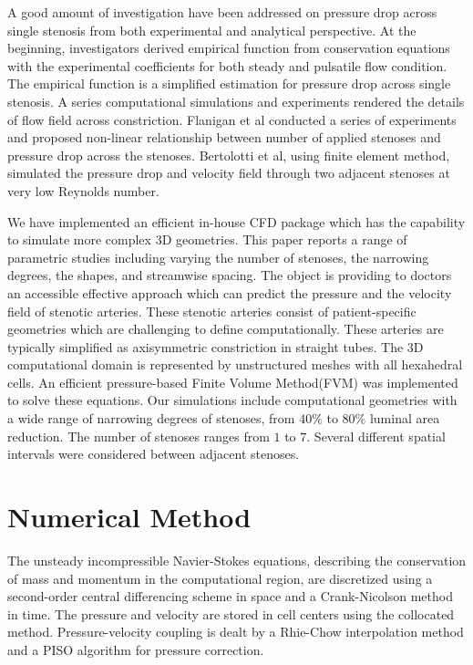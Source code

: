 A good amount of investigation have been addressed on pressure drop across single stenosis from both experimental and analytical perspective\cite{Ojha,Varghese,Young&Tsai,Young&Cholvin,Seeley&Young,Varghese&Frankel}. At the beginning, investigators derived empirical function from conservation equations with the experimental coefficients for both steady and pulsatile flow condition. The empirical function is a simplified estimation for pressure drop across single stenosis. A series computational simulations and experiments rendered the details of flow field across constriction. 
Flanigan et al\cite{flanigan1977multiple} conducted a series of experiments and proposed non-linear relationship between number of applied stenoses and pressure drop across the stenoses.
Bertolotti et al\cite{bertolotti2006influence}, using finite element method, simulated the pressure drop and velocity field through two adjacent stenoses at very low Reynolds number.

We have implemented an efficient in-house CFD package which has the capability to simulate more complex 3D geometries. This paper reports a range of parametric studies including varying the number of stenoses, the narrowing degrees, the shapes, and streamwise spacing. The object is providing to doctors an accessible effective approach which can predict the pressure and the velocity field of stenotic arteries. These stenotic arteries consist of patient-specific geometries which are challenging to define computationally. These arteries are typically simplified as axisymmetric constriction in straight tubes. The 3D computational domain is represented by unstructured meshes with all hexahedral cells. An efficient pressure-based Finite Volume Method(FVM)\cite{LiangFVM} was implemented to solve these equations. Our simulations include computational geometries with a wide range of narrowing degrees of stenoses, from $ 40\% $ to $ 80\% $ luminal area reduction. The number of stenoses ranges from $ 1 $ to $ 7 $. Several different spatial intervals were considered between adjacent stenoses.

\section{Numerical Method}

The unsteady incompressible Navier-Stokes equations, describing the conservation of mass and momentum in the computational region, are discretized using a second-order central differencing scheme in space and a Crank-Nicolson\cite{briley1977solution} method in time. 
The pressure and velocity are stored in cell centers using the collocated method.
Pressure-velocity coupling is dealt by a Rhie-Chow interpolation method\cite{Rhie} and a PISO algorithm for pressure correction\cite{Issa}.

